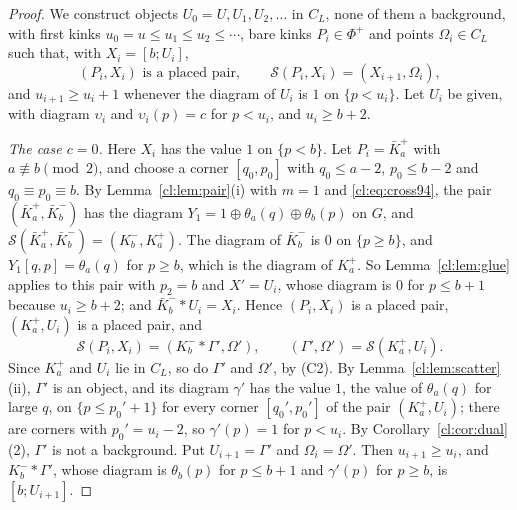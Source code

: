 \begin{proof}
We construct objects $U_0=U,U_1,U_2,\dots$ in $C_L$, none of them a background, with first kinks $u_0=u\le u_1\le u_2\le\cdots$, bare kinks $P_i\in\Phi^+$ and points $\Omega_i\in C_L$ such that, with $X_i=[b;U_i]$,
\begin{equation}\label{cl:eq:chain}
(P_i,X_i)\text{ is a placed pair},\qquad\mathcal S(P_i,X_i)=(X_{i+1},\Omega_i),
\end{equation}
and $u_{i+1}\ge u_i+1$ whenever the diagram of $U_i$ is $1$ on $\{p<u_i\}$. Let $U_i$ be given, with diagram $\upsilon_i$ and $\upsilon_i(p)=c$ for $p<u_i$, and $u_i\ge b+2$.

\emph{The case $c=0$.} Here $X_i$ has the value $1$ on $\{p<b\}$. Let $P_i=\bar K^+_a$ with $a\not\equiv b\pmod2$, and choose a corner $[q_0,p_0]$ with $q_0\le a-2$, $p_0\le b-2$ and $q_0\equiv p_0\equiv b$. By Lemma~\ref{cl:lem:pair}(i) with $m=1$ and \eqref{cl:eq:cross94}, the pair $(\bar K^+_a,\bar K^-_b)$ has the diagram $Y_1=1\oplus\theta_a(q)\oplus\theta_b(p)$ on $G$, and $\mathcal S(\bar K^+_a,\bar K^-_b)=(K^-_b,K^+_a)$. The diagram of $\bar K^-_b$ is $0$ on $\{p\ge b\}$, and $Y_1[q,p]=\theta_a(q)$ for $p\ge b$, which is the diagram of $K^+_a$. So Lemma~\ref{cl:lem:glue} applies to this pair with $p_2=b$ and $X'=U_i$, whose diagram is $0$ for $p\le b+1$ because $u_i\ge b+2$; and $\bar K^-_b*U_i=X_i$. Hence $(P_i,X_i)$ is a placed pair, $(K^+_a,U_i)$ is a placed pair, and
\[
\mathcal S(P_i,X_i)=(K^-_b*\Gamma',\Omega'),\qquad(\Gamma',\Omega')=\mathcal S(K^+_a,U_i).
\]
Since $K^+_a$ and $U_i$ lie in $C_L$, so do $\Gamma'$ and $\Omega'$, by (C2). By Lemma~\ref{cl:lem:scatter}(ii), $\Gamma'$ is an object, and its diagram $\gamma'$ has the value $1$, the value of $\theta_a(q)$ for large $q$, on $\{p\le p_0'+1\}$ for every corner $[q_0',p_0']$ of the pair $(K^+_a,U_i)$; there are corners with $p_0'=u_i-2$, so $\gamma'(p)=1$ for $p<u_i$. By Corollary~\ref{cl:cor:dual}(2), $\Gamma'$ is not a background. Put $U_{i+1}=\Gamma'$ and $\Omega_i=\Omega'$. Then $u_{i+1}\ge u_i$, and $K^-_b*\Gamma'$, whose diagram is $\theta_b(p)$ for $p\le b+1$ and $\gamma'(p)$ for $p\ge b$, is $[b;U_{i+1}]$.


\end{proof}
